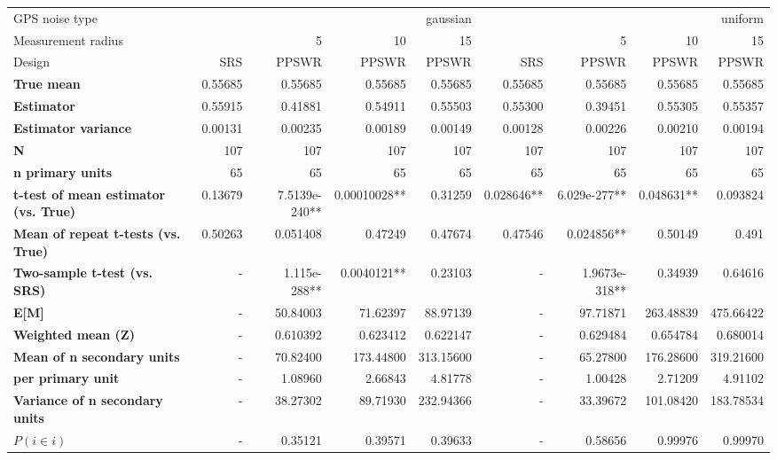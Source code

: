 \begin{tabular}{l|r|rrr|r|rrr}
\toprule
GPS noise type & \multicolumn{4}{r}{gaussian} & \multicolumn{4}{r}{uniform} \\
Measurement radius &  & 5 & 10 & 15 &  & 5 & 10 & 15 \\
Design & SRS & PPSWR & PPSWR & PPSWR & SRS & PPSWR & PPSWR & PPSWR \\
\midrule
\textbf{True mean} &  0.55685 &  0.55685 &  0.55685 &  0.55685 &  0.55685 &  0.55685 &  0.55685 &  0.55685 \\
\textbf{Estimator} & 0.55915 & 0.41881 & 0.54911 & 0.55503 & 0.55300 & 0.39451 & 0.55305 & 0.55357 \\
\textbf{Estimator variance} & 0.00131 & 0.00235 & 0.00189 & 0.00149 & 0.00128 & 0.00226 & 0.00210 & 0.00194 \\
\textbf{N} & 107 & 107 & 107 & 107 & 107 & 107 & 107 & 107 \\
\textbf{n primary units} & 65 & 65 & 65 & 65 & 65 & 65 & 65 & 65 \\
\textbf{t-test of mean estimator (vs. True)} & 0.13679 & 7.5139e-240** & 0.00010028** & 0.31259 & 0.028646** & 6.029e-277** & 0.048631** & 0.093824 \\
\textbf{Mean of repeat t-tests (vs. True)} & 0.50263 & 0.051408 & 0.47249 & 0.47674 & 0.47546 & 0.024856** & 0.50149 & 0.491 \\
\textbf{Two-sample t-test (vs. SRS)} & - & 1.115e-288** & 0.0040121** & 0.23103 & - & 1.9673e-318** & 0.34939 & 0.64616 \\
\textbf{E[M]} & - & 50.84003 & 71.62397 & 88.97139 & - & 97.71871 & 263.48839 & 475.66422 \\
\textbf{Weighted mean (Z)} & - & 0.610392 & 0.623412 & 0.622147 & - & 0.629484 & 0.654784 & 0.680014 \\
\textbf{Mean of n secondary units} & - & 70.82400 & 173.44800 & 313.15600 & - & 65.27800 & 176.28600 & 319.21600 \\
\textbf{     per primary unit} & - & 1.08960 & 2.66843 & 4.81778 & - & 1.00428 & 2.71209 & 4.91102 \\
\textbf{Variance of n secondary units} & - & 38.27302 & 89.71930 & 232.94366 & - & 33.39672 & 101.08420 & 183.78534 \\
\textbf{$P(i \in i)$} & - & 0.35121 & 0.39571 & 0.39633 & - & 0.58656 & 0.99976 & 0.99970 \\
\bottomrule
\end{tabular}
